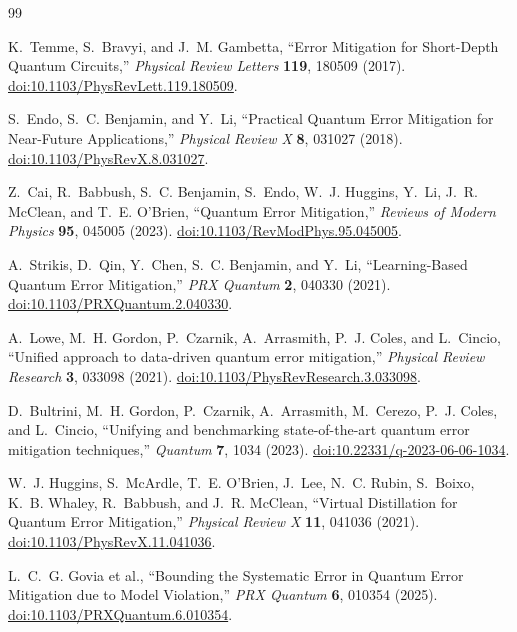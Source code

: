 \documentclass[a4paper,onecolumn,unpublished,nopdfoutputerror]{quantumarticle}
\theoremstyle{plain}
\theoremstyle{definition}
\newcommand{\1}{\mathbf{1}}
\begin{document}
\begin{thebibliography}{99}

K.~Temme, S.~Bravyi, and J.~M. Gambetta,
``Error Mitigation for Short-Depth Quantum Circuits,''
\emph{Physical Review Letters} \textbf{119}, 180509 (2017). \href{https://doi.org/10.1103/PhysRevLett.119.180509}{doi:10.1103/PhysRevLett.119.180509}.

S.~Endo, S.~C. Benjamin, and Y.~Li,
``Practical Quantum Error Mitigation for Near-Future Applications,''
\emph{Physical Review X} \textbf{8}, 031027 (2018). \href{https://doi.org/10.1103/PhysRevX.8.031027}{doi:10.1103/PhysRevX.8.031027}.

Z.~Cai, R.~Babbush, S.~C. Benjamin, S.~Endo, W.~J. Huggins, Y.~Li, J.~R. McClean, and T.~E. O'Brien,
``Quantum Error Mitigation,''
\emph{Reviews of Modern Physics} \textbf{95}, 045005 (2023). \href{https://doi.org/10.1103/RevModPhys.95.045005}{doi:10.1103/RevModPhys.95.045005}.

A.~Strikis, D.~Qin, Y.~Chen, S.~C. Benjamin, and Y.~Li,
``Learning-Based Quantum Error Mitigation,''
\emph{PRX Quantum} \textbf{2}, 040330 (2021). \href{https://doi.org/10.1103/PRXQuantum.2.040330}{doi:10.1103/PRXQuantum.2.040330}.

A.~Lowe, M.~H. Gordon, P.~Czarnik, A.~Arrasmith, P.~J. Coles, and L.~Cincio,
``Unified approach to data-driven quantum error mitigation,''
\emph{Physical Review Research} \textbf{3}, 033098 (2021). \href{https://doi.org/10.1103/PhysRevResearch.3.033098}{doi:10.1103/PhysRevResearch.3.033098}.

D.~Bultrini, M.~H. Gordon, P.~Czarnik, A.~Arrasmith, M.~Cerezo, P.~J. Coles, and L.~Cincio,
``Unifying and benchmarking state-of-the-art quantum error mitigation techniques,''
\emph{Quantum} \textbf{7}, 1034 (2023). \href{https://doi.org/10.22331/q-2023-06-06-1034}{doi:10.22331/q-2023-06-06-1034}.

W.~J. Huggins, S.~McArdle, T.~E. O'Brien, J.~Lee, N.~C. Rubin, S.~Boixo, K.~B. Whaley, R.~Babbush, and J.~R. McClean,
``Virtual Distillation for Quantum Error Mitigation,''
\emph{Physical Review X} \textbf{11}, 041036 (2021). \href{https://doi.org/10.1103/PhysRevX.11.041036}{doi:10.1103/PhysRevX.11.041036}.

L.~C.~G. Govia et al.,
``Bounding the Systematic Error in Quantum Error Mitigation due to Model Violation,''
\emph{PRX Quantum} \textbf{6}, 010354 (2025). \href{https://doi.org/10.1103/PRXQuantum.6.010354}{doi:10.1103/PRXQuantum.6.010354}.


\end{thebibliography}
\end{document}
